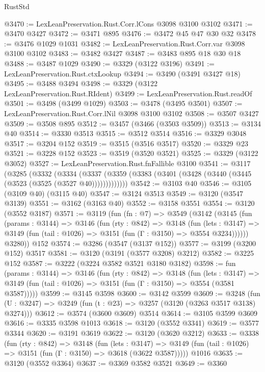 \begin{lexlean}{RustStd}
\begin{coremodule}
@3470 := LexLeanPreservation.Rust.Corr.lCons @3098 @3100 @3102
@3471 := @3470 @3427
@3472 := @3471 @895
@3476 := @3472 @45 @47 @30 @32
@3478 := @3476 @1029 @1031
@3482 := LexLeanPreservation.Rust.Corr.var @3098 @3100 @3102
@3483 := @3482 @3427
@3487 := @3483 @895 @18 @30 @18
@3488 := @3487 @1029
@3490 := @3329 (@3122 @3196)
@3491 := LexLeanPreservation.Rust.ctxLookup
@3494 := @3490 (@3491 @3427 @18)
@3495 := @3488 @3494
@3498 := @3329 (@3122 LexLeanPreservation.Rust.RIdent)
@3499 := LexLeanPreservation.Rust.readOf
@3501 := @3498 (@3499 @1029)
@3503 := @3478 (@3495 @3501)
@3507 := LexLeanPreservation.Rust.Corr.lNil @3098 @3100 @3102
@3508 := @3507 @3427
@3509 := @3508 @895
@3512 := @3457 (@3466 (@3503 @3509))
@3513 := @3134 @40
@3514 := @3330 @3513
@3515 := @3512 @3514
@3516 := @3329 @3048
@3517 := @3204 @152
@3519 := @3515 (@3516 @3517)
@3520 := @3329 @23
@3521 := @3228 @152
@3523 := @3519 (@3520 @3521)
@3525 := @3329 (@3122 @3052)
@3527 := LexLeanPreservation.Rust.fnFallible @3100
@3541 := @3117
    (@3285
      (@3332
        (@3334
          (@3337 (@3359 (@3383 (@3401 (@3428 (@3440 (@3445 (@3523 (@3525 (@3527 @40)))))))))))))
@3542 := @3103 @40
@3546 := @3105 (@3109 @40) (@3115 @40)
@3547 := @3124 @3513
@3549 := @3120 (@3547 @3139)
@3551 := @3162 (@3163 @40)
@3552 := @3158 @3551
@3554 := @3120 (@3552 @3187)
@3571 := @3119
    (fun (fn : @7) =>
    @3549
      (@3142
        (@3145
          (fun (params : @3144) =>
          @3146
            (fun (rty : @842) =>
            @3148
              (fun (lets : @3147) =>
              @3149 (fun (tail : @1026) => @3151 (fun (Γ : @3150) => @3554 @3234))))))
        @3280))
    @152
@3574 := @3286 (@3547 (@3137 @152))
@3577 := @3199 (@3200 @152) @3517
@3581 := @3120 (@3191 (@3577 @3208) @3212)
@3582 := @3225 @152
@3587 := @3222 (@3224 @3582 @3521 @3180 @3182)
@3598 := fun (params : @3144) =>
  @3146
    (fun (rty : @842) =>
    @3148
      (fun (lets : @3147) =>
      @3149 (fun (tail : @1026) => @3151 (fun (Γ : @3150) => @3554 (@3581 @3587)))))
@3599 := @3145 @3598
@3600 := @3142 @3599
@3609 := @3248 (fun (U : @3247) => @3249 (fun (t : @23) => @3257 (@3120 (@3263 @3517 @3138) @3274)))
@3612 := @3574 (@3600 @3609) @3514
@3614 := @3105 @3599 @3609
@3616 := @3335 @3598 @1013
@3618 := @3120 (@3552 @3341)
@3619 := @3577 @3344
@3620 := @3191 @3619
@3622 := @3120 (@3620 @3212)
@3633 := @3338
    (fun (rty : @842) =>
    @3148
      (fun (lets : @3147) =>
      @3149 (fun (tail : @1026) => @3151 (fun (Γ : @3150) => @3618 (@3622 @3587)))))
    @1016
@3635 := @3120 (@3552 @3364)
@3637 := @3369 @3582 @3521
@3649 := @3360

\end{coremodule}
\end{lexlean}
